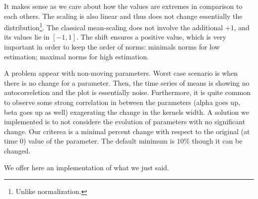 \documentclass[11pt]{book}
\begin{document}
It makes sense as we care about how the values are extremes in comparison to each others. The scaling is also linear and thus does not change essentially the distribution\footnote{Unlike normalization.}. The classical mean-scaling does not involve the additional $+1$, and its values lie in $[-1,1]$. The shift ensures a positive value, which is very important in order to keep the order of norms: minimals norms for low estimation; maximal norms for high estimation.


A problem appear with non-moving parameters. Worst case scenario is when there is no change for a parameter. Then, the time series of means is showing no autocorreletion and the plot is essentially noise. Furthermore, it is quite common to observe some strong correlation in between the parameters (alpha goes up, beta goes up as well) exagerating the change in the kernels width. A solution we implemented is to not considere the evolution of parameters with no significant change. Our criterea is a minimal percent change with respect to the original (at time 0) value of the parameter. The default minimum is $10\%$ though it can be changed.


We offer here an implementation of what we just said. 
\end{document}
